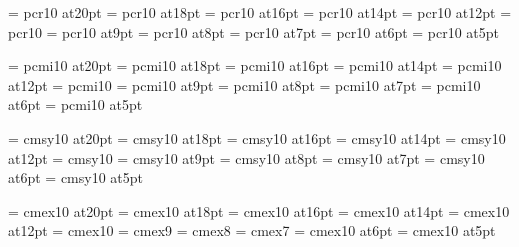 

\font\twentyrm=     pcr10 at20pt
\font\eighteenrm=   pcr10 at18pt
\font\sixteenrm=    pcr10 at16pt
\font\fourteenrm=   pcr10 at14pt
\font\twelverm=     pcr10 at12pt
\font\tenrm=        pcr10 %
\font\ninerm=       pcr10 at9pt
\font\eightrm=      pcr10 at8pt
\font\sevenrm=      pcr10 at7pt %
\font\sixrm=        pcr10 at6pt
\font\fiverm=       pcr10 at5pt %

\font\twentyi=      pcmi10 at20pt
\font\eighteeni=    pcmi10 at18pt
\font\sixteeni=     pcmi10 at16pt
\font\fourteeni=    pcmi10 at14pt
\font\twelvei=      pcmi10 at12pt
\font\teni=         pcmi10 %
\font\ninei=        pcmi10 at9pt
\font\eighti=       pcmi10 at8pt
\font\seveni=       pcmi10 at7pt %
\font\sixi=         pcmi10 at6pt
\font\fivei=        pcmi10 at5pt %

\font\twentysy=     cmsy10 at20pt
\font\eighteensy=   cmsy10 at18pt
\font\sixteensy=    cmsy10 at16pt
\font\fourteensy=   cmsy10 at14pt
\font\twelvesy=     cmsy10 at12pt
\font\tensy=        cmsy10 %
\font\ninesy=       cmsy10 at9pt
\font\eightsy=      cmsy10 at8pt
\font\sevensy=      cmsy10 at7pt %
\font\sixsy=        cmsy10 at6pt
\font\fivesy=       cmsy10 at5pt %

\font\twentyex=     cmex10 at20pt
\font\eighteenex=   cmex10 at18pt
\font\sixteenex=    cmex10 at16pt
\font\fourteenex=   cmex10 at14pt
\font\twelveex=     cmex10 at12pt
\font\tenex=        cmex10 %
\font\nineex=       cmex9
\font\eightex=      cmex8
\font\sevenex=      cmex7 %
\font\sixex=        cmex10 at6pt
\font\fiveex=       cmex10 at5pt %


